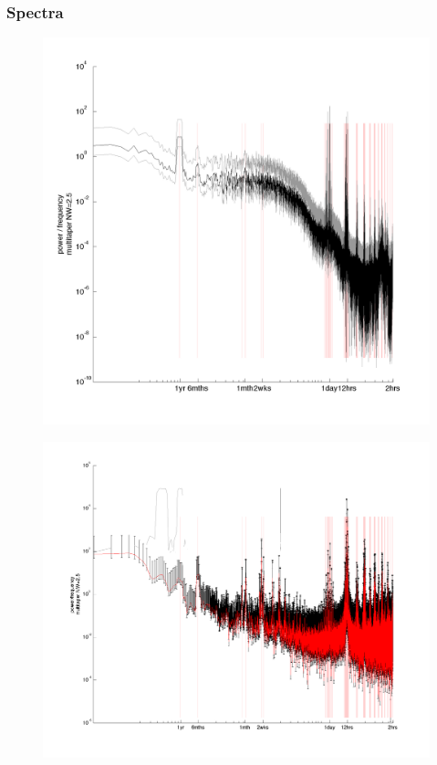 \begin{frame}
\frametitle{Spectra}
\begin{minipage}{0.45\textwidth}
    \begin{figure}      
    \includegraphics[width=\textwidth]{figures/plots/spectra_109504.png}
    \end{figure}
\end{minipage}
\hfill
\begin{minipage}{0.45\textwidth}
    \begin{figure}      
     \includegraphics[width=\textwidth]{figures/plots/sealevel_spectra.png}
    \end{figure} 
\end{minipage}
\end{frame}
